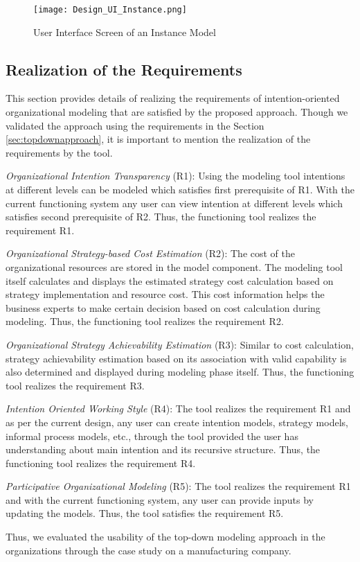 \begin{figure} [H]
	\centering
	\texttt{[image: Design\_UI\_Instance.png]}
	\caption{User Interface Screen of an Instance Model}
	\label{fig:realizationofinstances}
\end{figure}

\subsection{Realization of the Requirements}
\label{sec:validation}
This section provides details of realizing the requirements of intention-oriented organizational modeling that are satisfied by the proposed approach. Though we validated the approach using the requirements in the Section \ref{sec:topdownapproach}, it is important to mention the realization of the requirements by the tool.

\textit{Organizational Intention Transparency} (R1):  Using the modeling tool intentions at different levels can be modeled which satisfies first prerequisite of R1. With the current functioning system any user can view intention at different levels which satisfies second prerequisite of R2. Thus, the functioning tool realizes the requirement R1.

\textit{Organizational Strategy-based Cost Estimation} (R2): The cost of the organizational resources are stored in the model component. The modeling tool itself calculates and displays the estimated strategy cost calculation based on strategy implementation and resource cost. This cost information helps the business experts to make certain decision based on cost calculation during modeling. Thus, the functioning tool realizes the requirement R2.  

\textit{Organizational Strategy Achievability Estimation} (R3): Similar to cost calculation, strategy achievability estimation based on its association with valid capability is also determined and displayed during modeling phase itself. Thus, the functioning tool realizes the requirement R3.

\textit{Intention Oriented Working Style} (R4): The tool realizes the requirement R1 and as per the current design, any user can create intention models, strategy models, informal process models, etc., through the tool provided the user has understanding about main intention and its recursive structure. Thus, the functioning tool realizes the requirement R4.

\textit{Participative Organizational Modeling} (R5): The tool realizes the requirement R1 and with the current functioning system, any user can provide inputs by updating the models. Thus, the tool satisfies the requirement R5.

Thus, we evaluated the usability of the top-down modeling approach in the organizations through the case study on a manufacturing company. 
		

